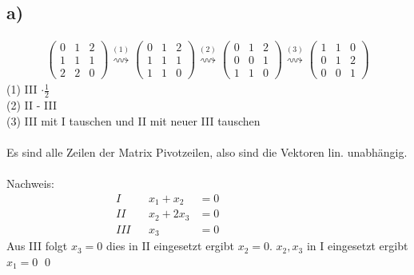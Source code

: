 \documentclass[titlepage]{article}
\begin{document}
		\subsection*{a)}
			\begin{align*}
				\begin{pmatrix}
					0&1&2\\
					1&1&1\\
					2&2&0
				\end{pmatrix}
				\overset{(1)}{\rightsquigarrow}
				\begin{pmatrix}
					0&1&2\\
					1&1&1\\
					1&1&0
				\end{pmatrix}
				\overset{(2)}{\rightsquigarrow}
				\begin{pmatrix}
					0&1&2\\
					0&0&1\\
					1&1&0
				\end{pmatrix}
				\overset{(3)}{\rightsquigarrow}
				\begin{pmatrix}
					1&1&0\\
					0&1&2\\
					0&0&1
				\end{pmatrix}
			\end{align*}
		(1) III $\cdot$$\frac{1}{2}$\\
		(2) II - III\\
		(3) III mit I tauschen und II mit neuer III tauschen\\\\
		Es sind alle Zeilen der Matrix Pivotzeilen, also sind die Vektoren lin. unabhängig.\\\\ Nachweis:
		\begin{align*}
			I& &x_1+x_2&=0&&&&&&&&&\\
			II& &x_2+2x_3&=0\\
			III& &x_3&=0
		\end{align*}
		Aus III folgt $x_3=0$ dies in II eingesetzt ergibt $x_2=0$. $x_2,x_3$ in I eingesetzt ergibt $x_1=0$ \qed
\end{document}
